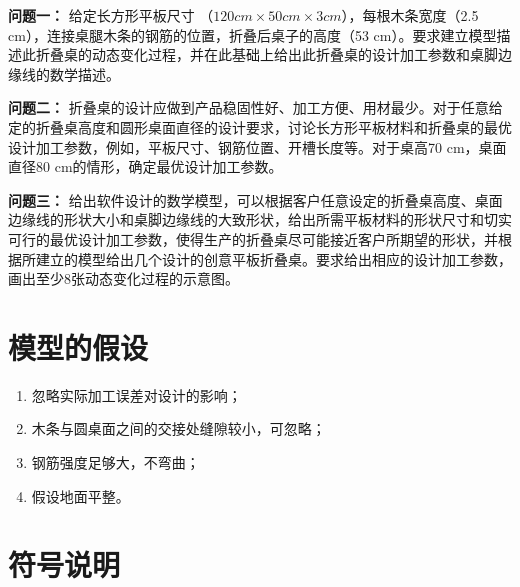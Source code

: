 \documentclass[bwprint]{gmcmthesis}
\numberwithin{equation}{section}
\numberwithin{figure}{section}
\numberwithin{table}{section}
\begin{document}
\textbf{问题一：} 给定长方形平板尺寸 （$120 cm \times 50 cm \times 3 cm$），每根木条宽度（2.5 cm），连接桌腿木条的钢筋的位置，折叠后桌子的高度（53 cm）。要求建立模型描述此折叠桌的动态变化过程，并在此基础上给出此折叠桌的设计加工参数和桌脚边缘线的数学描述。


\textbf{问题二：} 折叠桌的设计应做到产品稳固性好、加工方便、用材最少。对于任意给定的折叠桌高度和圆形桌面直径的设计要求，讨论长方形平板材料和折叠桌的最优设计加工参数，例如，平板尺寸、钢筋位置、开槽长度等。对于桌高70 cm，桌面直径80 cm的情形，确定最优设计加工参数。


\textbf{问题三：} 给出软件设计的数学模型，可以根据客户任意设定的折叠桌高度、桌面边缘线的形状大小和桌脚边缘线的大致形状，给出所需平板材料的形状尺寸和切实可行的最优设计加工参数，使得生产的折叠桌尽可能接近客户所期望的形状，并根据所建立的模型给出几个设计的创意平板折叠桌。要求给出相应的设计加工参数，画出至少8张动态变化过程的示意图。




\clearpage
\section{模型的假设}

\begin{enumerate}
\item 忽略实际加工误差对设计的影响；
\item 木条与圆桌面之间的交接处缝隙较小，可忽略；
\item 钢筋强度足够大，不弯曲；
\item 假设地面平整。
\end{enumerate}


\section{符号说明}
\end{document}
